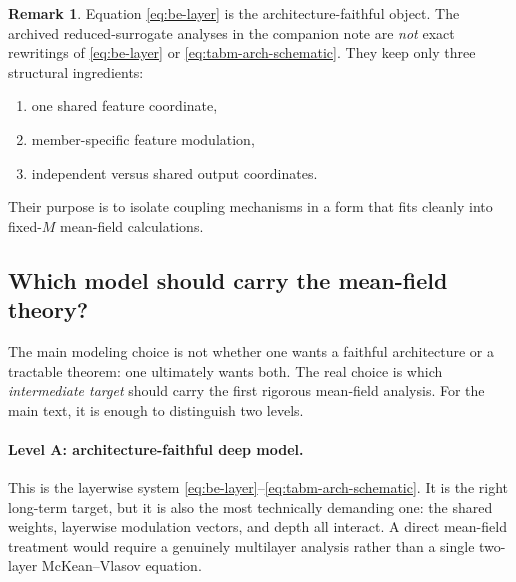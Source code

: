 \documentclass[11pt]{article}
\theoremstyle{definition}
\newtheorem{remark}[theorem]{Remark}
\begin{document}
\begin{remark}
Equation \eqref{eq:be-layer} is the architecture-faithful object.
The archived reduced-surrogate analyses in the companion note are \emph{not} exact rewritings of \eqref{eq:be-layer} or \eqref{eq:tabm-arch-schematic}.
They keep only three structural ingredients:
\begin{enumerate}[leftmargin=2em]
  \item one shared feature coordinate,
  \item member-specific feature modulation,
  \item independent versus shared output coordinates.
\end{enumerate}
Their purpose is to isolate coupling mechanisms in a form that fits cleanly into fixed-$M$ mean-field calculations.
\end{remark}

\subsection{Which model should carry the mean-field theory?}

The main modeling choice is not whether one wants a faithful architecture or a tractable theorem:
one ultimately wants both.
The real choice is which \emph{intermediate target} should carry the first rigorous mean-field analysis.
For the main text, it is enough to distinguish two levels.

\paragraph{Level A: architecture-faithful deep model.}
This is the layerwise system \eqref{eq:be-layer}--\eqref{eq:tabm-arch-schematic}.
It is the right long-term target, but it is also the most technically demanding one:
the shared weights, layerwise modulation vectors, and depth all interact.
A direct mean-field treatment would require a genuinely multilayer analysis rather than a single two-layer McKean--Vlasov equation.
\end{document}
